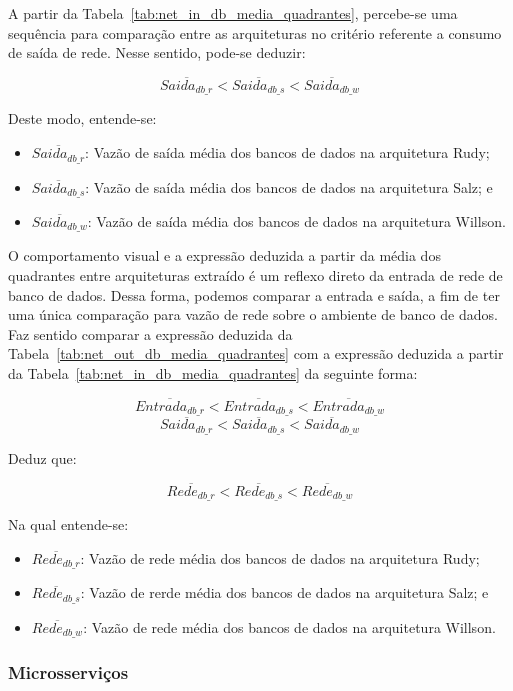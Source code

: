 A partir da Tabela~\ref{tab:net_in_db_media_quadrantes}, percebe-se uma sequência para comparação entre as arquiteturas no critério referente a consumo de saída de rede.
%
Nesse sentido, pode-se deduzir:

$$
    \overline{Saida_{db\_r}} < \overline{Saida_{db\_s}} < \overline{Saida_{db\_w}}
$$

Deste modo, entende-se:

\begin{itemize}
 \item $\overline{Saida_{db\_r}}$: Vazão de saída média dos bancos de dados na arquitetura Rudy;
 \item $\overline{Saida_{db\_s}}$: Vazão de saída média dos bancos de dados na arquitetura Salz; e
 \item $\overline{Saida_{db\_w}}$: Vazão de saída média dos bancos de dados na arquitetura Willson.
\end{itemize}

O comportamento visual e a expressão deduzida a partir da média dos quadrantes entre arquiteturas extraído é um reflexo direto da entrada de rede de banco de dados.
%
Dessa forma, podemos comparar a entrada e saída, a fim de ter uma única comparação para vazão de rede sobre o ambiente de banco de dados.
%
Faz sentido comparar a expressão deduzida da Tabela~\ref{tab:net_out_db_media_quadrantes} com a expressão deduzida a partir da Tabela~\ref{tab:net_in_db_media_quadrantes} da seguinte forma:

$$
    \overline{Entrada_{db\_r}} < \overline{Entrada_{db\_s}} < \overline{Entrada_{db\_w}}
$$
$$
    \overline{Saida_{db\_r}} < \overline{Saida_{db\_s}} < \overline{Saida_{db\_w}}
$$

Deduz que:

$$
    \overline{Rede_{db\_r}} < \overline{Rede_{db\_s}} < \overline{Rede_{db\_w}}
$$

Na qual entende-se:

\begin{itemize}
 \item $\overline{Rede_{db\_r}}$: Vazão de rede média dos bancos de dados na arquitetura Rudy;
 \item $\overline{Rede_{db\_s}}$: Vazão de rerde média dos bancos de dados na arquitetura Salz; e
 \item $\overline{Rede_{db\_w}}$: Vazão de rede média dos bancos de dados na arquitetura Willson.
\end{itemize}

\subsubsection{Microsserviços}

